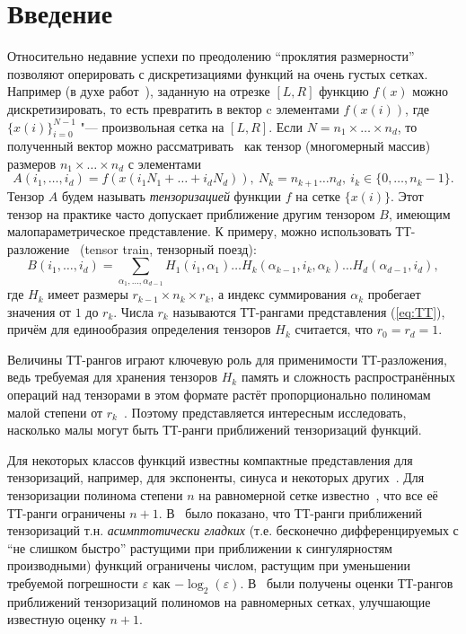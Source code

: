 \documentclass[3p]{cmmp}%
\numberwithin{equation}{section}
\begin{document}


\section{Введение}
\label{sec-1}

	Относительно недавние успехи по преодолению ``проклятия размерности'' позволяют оперировать с дискретизациями функций на очень густых сетках. 
Например (в духе работ~\cite{Oseledets2013,Grasedyck2010,Khoromskij2011,Tyrtyshnikov2003,Vysotsky2020}), заданную на отрезке $[L,R]$ функцию $f(x)$ можно дискретизировать, то есть превратить в вектор c элементами $f(x(i))$, где $\{x(i)\}_{i = 0}^{N-1}$ "--- произвольная сетка на $[L, R]$.
%
Если $N = n_1 \times \dots \times n_d$, то 
полученный вектор можно рассматривать~\cite{Oseledets2009} как тензор (многомерный массив) размеров $n_1 \times \dots \times n_d$ с элементами
\[
A(i_1, \dots, i_d) = f\left(x(i_1 N_1 + \dots + i_d N_d)\right), ~N_k = n_{k+1}\dots n_d,~ i_k \in \{0, \dots, n_k-1\}.
\]
Тензор $A$ будем называть \emph{тензоризацией} функции $f$ на сетке $\{x(i)\}$.
Этот тензор на практике часто допускает приближение другим тензором $B$, имеющим малопараметрическое представление.
К примеру, можно использовать ТТ-разложение~\cite{Oseledets2011,Grasedyck2010} (tensor train, тензорный поезд):
\begin{equation}\label{eq:TT}
B(i_1, \dots, i_d) = \sum_{\alpha_1, \dots, \alpha_{d-1}}H_1(i_1,\alpha_1) \dots H_k(\alpha_{k-1}, i_{k}, \alpha_{k}) \dots H_d(\alpha_{d-1}, i_d),
\end{equation}
где $H_k$ имеет размеры $r_{k-1} \times n_k \times r_{k}$, а индекс суммирования $\alpha_k$ пробегает значения от $1$ до $r_k$.
Числа $r_k$ называются ТТ-рангами представления (\ref{eq:TT}), причём для единообразия определения тензоров $H_k$ считается, что $r_0=r_d=1$.

Величины ТТ-рангов играют ключевую роль для применимости ТТ-разложения, ведь требуемая для хранения тензоров $H_k$ память и сложность распространённых операций над тензорами в этом формате растёт пропорционально полиномам малой степени от $r_k$~\cite{Oseledets2011}.
Поэтому представляется интересным исследовать, насколько малы могут быть ТТ-ранги приближений тензоризаций функций.

Для некоторых классов функций известны компактные представления для тензоризаций, например, для экспоненты, синуса и некоторых других~\cite{Khoromskij2011,Oseledets2013}.
Для тензоризации полинома степени $n$ на равномерной сетке известно~\cite{Khoromskij2011,Grasedyck2010}, что все её ТТ-ранги ограничены $n+1$.
В~\cite{Grasedyck2010} было показано, что ТТ-ранги приближений тензоризаций т.н. \emph{асимптотически гладких} (т.е. бесконечно дифференцируемых с ``не слишком быстро'' растущими при приближении к сингулярностям производными) функций ограничены числом, растущим при уменьшении требуемой погрешности $\varepsilon$ как $-\log_2(\varepsilon)$.
В~\cite{Vysotsky2020} были получены оценки ТТ-рангов приближений тензоризаций полиномов на равномерных сетках, улучшающие известную оценку $n+1$.
\end{document}
